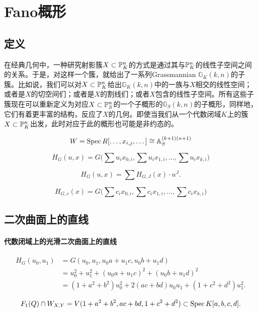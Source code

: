 \section{Fano概形}\label{s:4.3}
\subsection{定义}\label{s:4.3.1}

在经典几何中，一种研究射影簇$X\subset \mathbb{P}_K^n$的方式是通过其与$\mathbb{P}_K^n$的线性子空间之间的关系。于是，对这样一个簇，就给出了一系列Grassmannian $\mathbb G_K(k,n)$的子簇。比如说，我们可以对$X\subset \mathbb{P}_K^n$给出$\mathbb G_K(k,n)$中的一族与$X$相交的线性空间；或者是$X$的切空间们；或者是$X$的割线们；或者$X$包含的线性子空间。所有这些子簇现在可以重新定义为对应$X\subset \mathbb{P}_S^n$的一个子概形的$\mathbb G_S(k,n)$的子概形，同样地，它们有着更丰富的结构，反应了$X$的几何。即使当我们从一个代数闭域$K$上的簇$X\subset \mathbb{P}_K^n$出发，此时对应于此的概形也可能是非约态的。

\nottran


\[
	W=\operatorname{Spec} R[\dots,x_{i,j},\dots]\cong \mathbb{A}_S^{(k+1)(n+1)}
\]

\[
	H_G(u,x)=G\bigl(\sum u_ix_{0,i},\sum u_ix_{1,i},\dots,\sum u_ix_{k,i}\bigr)
\]

\[
	H_G(u,x)=\sum H_{G,J}(x)\cdot u^J.
\]

\[
	H_{G,c}(x)=G\bigl(\sum c_ix_{0,i},\sum c_ix_{1,i},\dots,\sum c_ix_{k,i}\bigr)
\]


\subsection{二次曲面上的直线}\label{s:4.3.2}

\paragraph*{代数闭域上的光滑二次曲面上的直线}

\[
	\begin{aligned}
		H_G(u_0,u_1)&=G(u_0,u_1,u_0a+u_1c,u_0b+u_1d)\\
		&=u_0^2+u_1^2+(u_0a+u_1c)^2+(u_0b+u_1d)^2\\
		&=(1+a^2+b^2)u_0^2+2(ac+bd)u_0u_1+(1+c^2+d^2)u_1^2.
	\end{aligned}
\]

\[
	F_1(Q)\cap W_{X,Y}=V(1+a^2+b^2,ac+bd,1+c^2+d^2)\subset \operatorname{Spec} K[a,b,c,d].
\]


